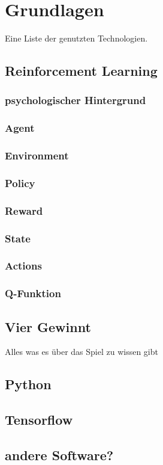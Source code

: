 \chapter{Grundlagen}%

\label{cha:Schluss}

Eine Liste der genutzten Technologien.

\section{Reinforcement Learning}
\subsection{psychologischer Hintergrund}

\subsection{Agent}

\subsection{Environment}

\subsection{Policy}

\subsection{Reward}

\subsection{State}

\subsection{Actions}

\subsection{Q-Funktion}


\section{Vier Gewinnt}
Alles was es über das Spiel zu wissen gibt

\section{Python}
\section{Tensorflow}
\section{andere Software?}